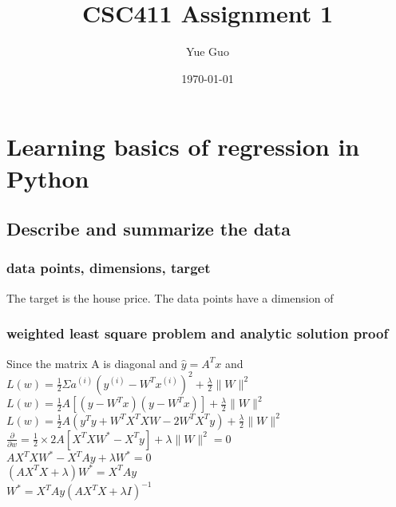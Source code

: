 \documentclass[letterpaper]{article}
\date{\today}
\title{CSC411 Assignment 1}
\author{Yue Guo}
\begin{document}
\maketitle


\section{Learning basics of regression in Python }

\subsection{Describe and summarize the data}

\subsubsection{data points, dimensions, target}
The target is the house price. The data points have a dimension of 

\subsubsection{weighted least square problem and analytic solution proof}
Since the matrix A is diagonal and $\hat{y} =A^T x$ and $L(w) = \frac{1}{2} \Sigma a^{(i)}(y^{(i)} - W^T x^{(i)} )^{2} + \frac{\lambda}{2} \lVert W \rVert ^{2}$ \\
$ L(w) = \frac{1}{2} A [(y - W^T x)(y - W^T x)] + \frac{\lambda}{2} \lVert W \rVert ^{2}$\\
$ L(w) = \frac{1}{2} A (y^T y + W^T X^T XW -2W^T  X^T y) +\frac{\lambda}{2}  \lVert W \rVert ^{2}$\\
$ \frac{\partial}{\partial{w}} =\frac{1}{2} \times 2 A[X^T X W^{*} - X^T y] + \lambda \lVert W \rVert ^{2} = 0$\\
$A X^T X W^{*} - X^T Ay + \lambda W^{*} = 0 $\\
$(A X^T X + \lambda)W^{*} = X^T Ay  $\\
$W^{*} = X^T Ay (A X^T X + \lambda I)^{-1} $






\end{document}
